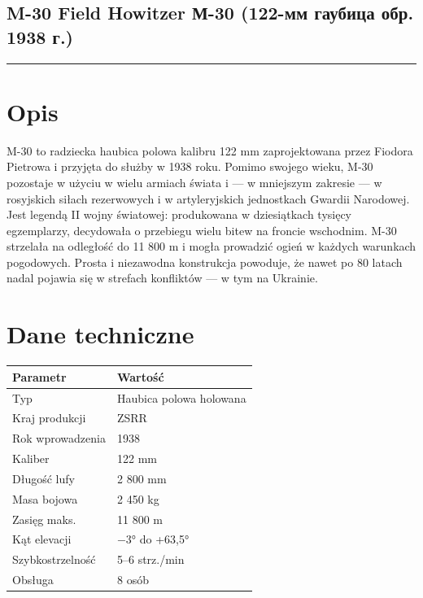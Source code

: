\documentclass[12pt,openany,oneside]{book}
\begin{document}
\subsection{M-30 Field Howitzer \textbar{} М-30 (122-мм гаубица обр.
1938
г.)}\label{m-30-field-howitzer-ux43c-30-122-ux43cux43c-ux433ux430ux443ux431ux438ux446ux430-ux43eux431ux440.-1938-ux433.}

\begin{center}\rule{0.5\linewidth}{0.5pt}\end{center}

\section{Opis}\label{opis-17}

M-30 to radziecka haubica polowa kalibru 122 mm zaprojektowana przez
Fiodora Pietrowa i przyjęta do służby w 1938 roku. Pomimo swojego wieku,
M-30 pozostaje w użyciu w wielu armiach świata i --- w mniejszym
zakresie --- w rosyjskich siłach rezerwowych i w artyleryjskich
jednostkach Gwardii Narodowej. Jest legendą II wojny światowej:
produkowana w dziesiątkach tysięcy egzemplarzy, decydowała o przebiegu
wielu bitew na froncie wschodnim. M-30 strzelała na odległość do 11 800
m i mogła prowadzić ogień w każdych warunkach pogodowych. Prosta i
niezawodna konstrukcja powoduje, że nawet po 80 latach nadal pojawia się
w strefach konfliktów --- w tym na Ukrainie.

\section{Dane techniczne}\label{dane-techniczne-17}

\begin{longtable}[]{@{}ll@{}}
\toprule\noalign{}
Parametr & Wartość \\
\midrule\noalign{}
\endhead
\bottomrule\noalign{}
\endlastfoot
Typ & Haubica polowa holowana \\
Kraj produkcji & ZSRR \\
Rok wprowadzenia & 1938 \\
Kaliber & 122 mm \\
Długość lufy & 2 800 mm \\
Masa bojowa & 2 450 kg \\
Zasięg maks. & 11 800 m \\
Kąt elevacji & −3° do +63,5° \\
Szybkostrzelność & 5--6 strz./min \\
Obsługa & 8 osób \\
\end{longtable}
\end{document}
